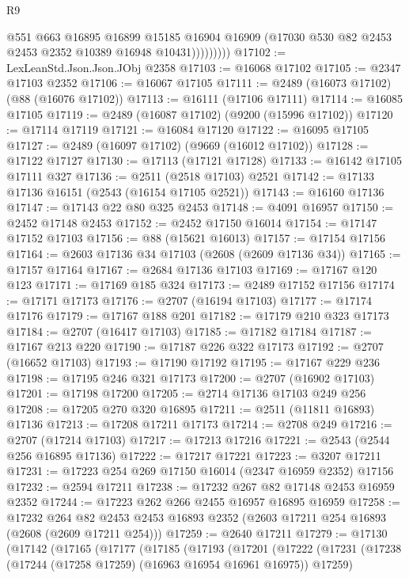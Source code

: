 \begin{lexlean}{R9}
\begin{coremodule}
                    @551
                    @663
                    @16895
                    @16899
                    @15185
                    @16904
                    @16909
                    (@17030 @530 @82 @2453 @2453 @2352 @10389 @16948 @10431)))))))))
@17102 := LexLeanStd.Json.Json.JObj @2358
@17103 := @16068 @17102
@17105 := @2347 @17103 @2352
@17106 := @16067 @17105
@17111 := @2489 (@16073 @17102) (@88 (@16076 @17102))
@17113 := @16111 (@17106 @17111)
@17114 := @16085 @17105
@17119 := @2489 (@16087 @17102) (@9200 (@15996 @17102))
@17120 := @17114 @17119
@17121 := @16084 @17120
@17122 := @16095 @17105
@17127 := @2489 (@16097 @17102) (@9669 (@16012 @17102))
@17128 := @17122 @17127
@17130 := @17113 (@17121 @17128)
@17133 := @16142 @17105 @17111 @327
@17136 := @2511 (@2518 @17103) @2521
@17142 := @17133 @17136 @16151 (@2543 (@16154 @17105 @2521))
@17143 := @16160 @17136
@17147 := @17143 @22 @80 @325 @2453
@17148 := @4091 @16957
@17150 := @2452 @17148 @2453
@17152 := @2452 @17150 @16014
@17154 := @17147 @17152 @17103
@17156 := @88 (@15621 @16013)
@17157 := @17154 @17156
@17164 := @2603 @17136 @34 @17103 (@2608 (@2609 @17136 @34))
@17165 := @17157 @17164
@17167 := @2684 @17136 @17103
@17169 := @17167 @120 @123
@17171 := @17169 @185 @324
@17173 := @2489 @17152 @17156
@17174 := @17171 @17173
@17176 := @2707 (@16194 @17103)
@17177 := @17174 @17176
@17179 := @17167 @188 @201
@17182 := @17179 @210 @323 @17173
@17184 := @2707 (@16417 @17103)
@17185 := @17182 @17184
@17187 := @17167 @213 @220
@17190 := @17187 @226 @322 @17173
@17192 := @2707 (@16652 @17103)
@17193 := @17190 @17192
@17195 := @17167 @229 @236
@17198 := @17195 @246 @321 @17173
@17200 := @2707 (@16902 @17103)
@17201 := @17198 @17200
@17205 := @2714 @17136 @17103 @249 @256
@17208 := @17205 @270 @320 @16895
@17211 := @2511 (@11811 @16893) @17136
@17213 := @17208 @17211 @17173
@17214 := @2708 @249
@17216 := @2707 (@17214 @17103)
@17217 := @17213 @17216
@17221 := @2543 (@2544 @256 @16895 @17136)
@17222 := @17217 @17221
@17223 := @3207 @17211
@17231 := @17223 @254 @269 @17150 @16014 (@2347 @16959 @2352) @17156
@17232 := @2594 @17211
@17238 := @17232 @267 @82 @17148 @2453 @16959 @2352
@17244 := @17223 @262 @266 @2455 @16957 @16895 @16959
@17258 := @17232
    @264
    @82
    @2453
    @2453
    @16893
    @2352
    (@2603 @17211 @254 @16893 (@2608 (@2609 @17211 @254)))
@17259 := @2640 @17211
@17279 := @17130
    (@17142
      (@17165
        (@17177
          (@17185
            (@17193
              (@17201
                (@17222
                  (@17231
                    (@17238 (@17244 (@17258 @17259) (@16963 @16954 @16961 @16975)) @17259)

\end{coremodule}
\end{lexlean}
